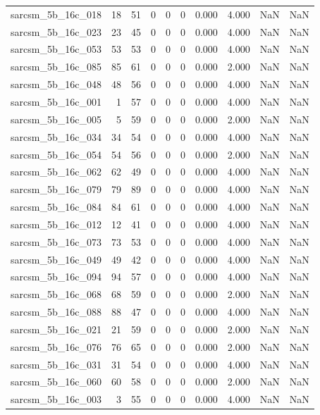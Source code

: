 \documentclass{article}
\begin{document}
\begin{longtable}{lrrrrrrrrr}
sarcsm\_5b\_16c\_018 & 18 & 51 & 0 & 0 & 0 & 0.000 & 4.000 & NaN & NaN \\
sarcsm\_5b\_16c\_023 & 23 & 45 & 0 & 0 & 0 & 0.000 & 4.000 & NaN & NaN \\
sarcsm\_5b\_16c\_053 & 53 & 53 & 0 & 0 & 0 & 0.000 & 4.000 & NaN & NaN \\
sarcsm\_5b\_16c\_085 & 85 & 61 & 0 & 0 & 0 & 0.000 & 2.000 & NaN & NaN \\
sarcsm\_5b\_16c\_048 & 48 & 56 & 0 & 0 & 0 & 0.000 & 4.000 & NaN & NaN \\
sarcsm\_5b\_16c\_001 & 1 & 57 & 0 & 0 & 0 & 0.000 & 4.000 & NaN & NaN \\
sarcsm\_5b\_16c\_005 & 5 & 59 & 0 & 0 & 0 & 0.000 & 2.000 & NaN & NaN \\
sarcsm\_5b\_16c\_034 & 34 & 54 & 0 & 0 & 0 & 0.000 & 4.000 & NaN & NaN \\
sarcsm\_5b\_16c\_054 & 54 & 56 & 0 & 0 & 0 & 0.000 & 2.000 & NaN & NaN \\
sarcsm\_5b\_16c\_062 & 62 & 49 & 0 & 0 & 0 & 0.000 & 4.000 & NaN & NaN \\
sarcsm\_5b\_16c\_079 & 79 & 89 & 0 & 0 & 0 & 0.000 & 4.000 & NaN & NaN \\
sarcsm\_5b\_16c\_084 & 84 & 61 & 0 & 0 & 0 & 0.000 & 4.000 & NaN & NaN \\
sarcsm\_5b\_16c\_012 & 12 & 41 & 0 & 0 & 0 & 0.000 & 4.000 & NaN & NaN \\
sarcsm\_5b\_16c\_073 & 73 & 53 & 0 & 0 & 0 & 0.000 & 4.000 & NaN & NaN \\
sarcsm\_5b\_16c\_049 & 49 & 42 & 0 & 0 & 0 & 0.000 & 4.000 & NaN & NaN \\
sarcsm\_5b\_16c\_094 & 94 & 57 & 0 & 0 & 0 & 0.000 & 4.000 & NaN & NaN \\
sarcsm\_5b\_16c\_068 & 68 & 59 & 0 & 0 & 0 & 0.000 & 2.000 & NaN & NaN \\
sarcsm\_5b\_16c\_088 & 88 & 47 & 0 & 0 & 0 & 0.000 & 4.000 & NaN & NaN \\
sarcsm\_5b\_16c\_021 & 21 & 59 & 0 & 0 & 0 & 0.000 & 2.000 & NaN & NaN \\
sarcsm\_5b\_16c\_076 & 76 & 65 & 0 & 0 & 0 & 0.000 & 2.000 & NaN & NaN \\
sarcsm\_5b\_16c\_031 & 31 & 54 & 0 & 0 & 0 & 0.000 & 4.000 & NaN & NaN \\
sarcsm\_5b\_16c\_060 & 60 & 58 & 0 & 0 & 0 & 0.000 & 2.000 & NaN & NaN \\
sarcsm\_5b\_16c\_003 & 3 & 55 & 0 & 0 & 0 & 0.000 & 4.000 & NaN & NaN \\

\end{longtable}
\end{document}
